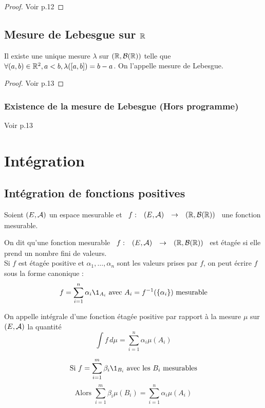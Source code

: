 \documentclass[]{report}
\begin{document}
\begin{proof}
    Voir p.12
\end{proof}

\section{Mesure de Lebesgue sur $\mathbb{R}$}

\begin{tm}
    Il existe une unique mesure $\lambda$ sur $(\mathbb{R},\mathcal{B}(\mathbb{R}))$ telle que $\forall(a,b)\in\mathbb{R}^2,a<b,\lambda([a,b])=b-a$. On l'appelle mesure de Lebesgue.
\end{tm}

\begin{proof}
    Voir p.13
\end{proof}

\subsection*{Existence de la mesure de Lebesgue (Hors programme)}
Voir p.13

\chapter{Intégration}

\section{Intégration de fonctions positives}

Soient $(E,\mathcal{A})$ un espace mesurable et $\begin{array}{ccccc} f : & (E,\mathcal{A}) & \to & (\mathbb{R},\mathcal{B}(\mathbb{R})) \end{array}$ une fonction mesurable.

\begin{df}
    On dit qu'une fonction mesurable $\begin{array}{ccccc} f : & (E,\mathcal{A}) & \to & (\mathbb{R},\mathcal{B}(\mathbb{R})) \end{array}$ est étagée si elle prend un nombre fini de valeurs.\\
    Si $f$ est étagée positive et $\alpha_1,\dots,\alpha_n$ sont les valeurs prises par $f$, on peut écrire $f$ sous la forme canonique : $$f=\sum_{i=1}^n\alpha_i \1_{A_i} \text{ avec }A_i=f^{-1}(\{\alpha_i\})\text{ mesurable} $$
\end{df}

\begin{df}
    On appelle intégrale d'une fonction étagée positive par rapport à la mesure $\mu$ sur $(E,\mathcal{A})$ la quantité $$\int f\,d\mu=\sum_{i=1}^n\alpha_i \mu (A_i)$$
\end{df}

\begin{re}
    $$\text{Si }f=\sum_{i=1}^m\beta_i\1_{B_i}\text{ avec les }B_i\text{ mesurables}$$
    $$\text{Alors }\sum_{i=1}^m\beta_i\mu(B_i)=\sum_{i=1}^n\alpha_i\mu(A_i)$$
\end{re}
\end{document}
